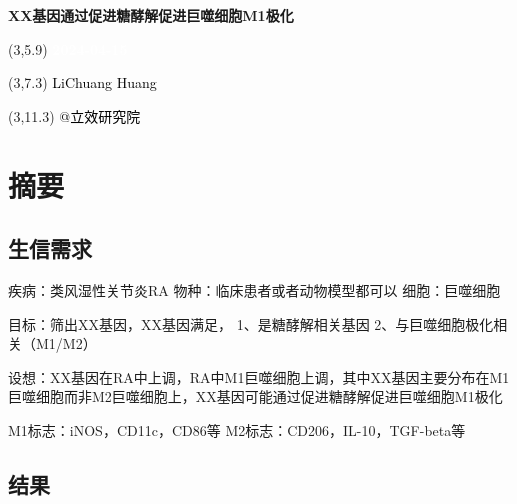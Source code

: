\documentclass[
]{article}
\author{}
\date{\vspace{-2.5em}}
\begin{document}
\begin{titlepage} 
\begin{center} \textbf{\Huge
XX基因通过促进糖酵解促进巨噬细胞M1极化}
\vspace{4em} \begin{textblock}{10}(3,5.9) \huge
\textbf{\textcolor{white}{2024-04-15}}
\end{textblock} \begin{textblock}{10}(3,7.3)
\Large \textcolor{black}{LiChuang Huang}
\end{textblock} \begin{textblock}{10}(3,11.3)
\Large \textcolor{black}{@立效研究院}
\end{textblock} \end{center} \end{titlepage}
\restoregeometry


\tableofcontents

\listoffigures

\listoftables

\newpage


\hypertarget{abstract}{%
\section{摘要}\label{abstract}}

\hypertarget{ux751fux4fe1ux9700ux6c42}{%
\subsection{生信需求}\label{ux751fux4fe1ux9700ux6c42}}

疾病：类风湿性关节炎RA
物种：临床患者或者动物模型都可以
细胞：巨噬细胞

目标：筛出XX基因，XX基因满足，
1、是糖酵解相关基因
2、与巨噬细胞极化相关（M1/M2）

设想：XX基因在RA中上调，RA中M1巨噬细胞上调，其中XX基因主要分布在M1巨噬细胞而非M2巨噬细胞上，XX基因可能通过促进糖酵解促进巨噬细胞M1极化

M1标志：iNOS，CD11c，CD86等
M2标志：CD206，IL-10，TGF-beta等

\hypertarget{ux7ed3ux679c}{%
\subsection{结果}\label{ux7ed3ux679c}}
\end{document}
